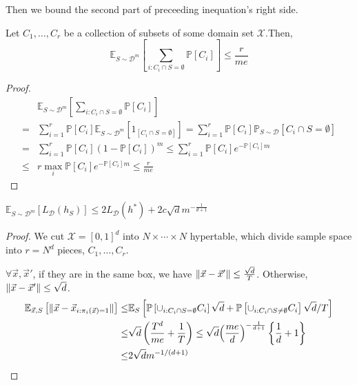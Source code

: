 Then we bound the second part of preceeding inequation's right side.

\begin{lemma}
    Let $ C_1, \ldots, C_r $ be a collection of subsets of some domain set $ \mathcal{X} $.Then,
    \[
        \mathbb{E}_{S \sim \mathcal{D}^m}\left[ \sum^{}_{i: C_i \cap S = \emptyset} \mathbb{P} [C_i] \right] \le \frac{r}{me} 
    \]
    \begin{proof}
        \begin{align*} &\mathbb{E}_{S \sim \mathcal{D}^m}\left[ \sum^{}_{i: C_i \cap S = \emptyset} \mathbb{P} [C_i] \right]\\
            =& \sum^{r}_{i=1} \mathbb{P}\left[ C_i \right]\mathbb{E}_{S\sim \mathcal{D}^m} \left[ 1_{\left[ C_i \cap S = \emptyset \right]} \right]
            = \sum^{r}_{i=1} \mathbb{P}\left[ C_i \right] \mathbb{P}_{S \sim \mathcal{D}} \left[ C_i \cap S = \emptyset \right]\\
            =& \sum^{r}_{i=1} \mathbb{P}\left[ C_i \right] {(1 - \mathbb{P}\left[ C_i \right])}^m \le \sum^{r}_{i=1} \mathbb{P}\left[ C_i \right] e^{-\mathbb{P}\left[ C_i \right] m}\\
            \le& r \max_{i} \mathbb{P}\left[ C_i \right] e^{-\mathbb{P}\left[ C_i \right]m} \le \frac{r}{me} 
        \end{align*}
    \end{proof}
\end{lemma}

\begin{theorem}
    $ \mathbb{E}_{S \sim \mathcal{D}^m} \left[ L_{\mathcal{D}}(h_S) \right] \le 2 L_{\mathcal{D}}(h^*) + 2c \sqrt d m ^{- \frac{1}{d+1} }$
    \begin{proof}
        We cut $ \mathcal{X} = {\left[ 0, 1 \right]}^d $ into $ N\times \cdots \times N $ hypertable, which divide sample space into $ r = N^d $ pieces, $ C_1, \ldots, C_r $.

        $ \forall \vec{x}, \vec{x}' $, if they are in the same box, we have $ \Arrowvert \vec{x} - \vec{x}' \Arrowvert \le \frac{\sqrt d}{T} $. Otherwise, $ \Arrowvert \vec{x} - \vec{x}' \Arrowvert \le \sqrt{d}$.
        \begin{align*}
            \mathbb{E}_{\vec{x}, S} \left[ \Arrowvert \vec{x} - \vec{x}_{i: \pi_i(\vec{x}) = 1}\Arrowvert \right]
            \le& \mathbb{E}_{S} \left[ \mathbb{P}\left[ \cup _{i:C_i \cap S = \emptyset} C_i \right] \sqrt{d} + \mathbb{P}\left[ \cup_{i: C_i \cap S \ne \emptyset} C_i \right] \sqrt{d}/T \right]\\
            \le& \sqrt{d} \left( \frac{T^d}{me} + \frac{1}{T} \right) \le \sqrt{d} {\left( \frac{me}{d} \right)}^{- \frac{1}{d+1}} \left\{ \frac{1}{d} +1 \right\} \\
            \le& 2\sqrt d m^{-1/(d+1)}
        \end{align*}
    \end{proof}
\end{theorem}

